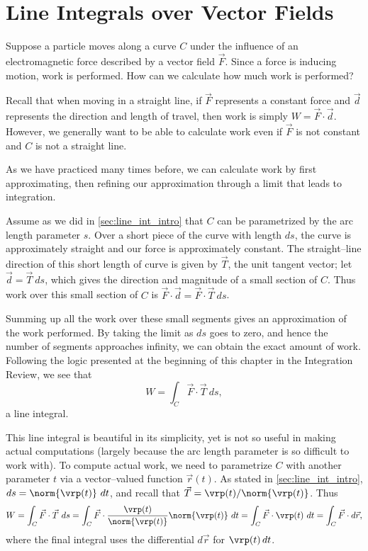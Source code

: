 \section{Line Integrals over Vector Fields}\label{sec:line_int_vf}

Suppose a particle moves along a curve $C$ under the influence of an electromagnetic force described by a vector field $\vec F$. Since a force is inducing motion, work is performed. How can we calculate how much work is performed?

Recall that when moving in a straight line, if $\vec F$ represents a constant force and $\vec d$ represents the direction and length of travel, then work is simply $W = \vec F\cdot \vec d$. However, we generally want to be able to calculate work even if $\vec F$ is not constant and $C$ is not a straight line.

As we have practiced many times before, we can calculate work by first approximating, then refining our approximation through a limit that leads to integration. 

Assume as we did in \autoref{sec:line_int_intro} that $C$ can be parametrized by the arc length parameter $s$. Over a short piece of the curve with length $ds$, the curve is approximately straight and our force is approximately constant. The straight--line direction of this short length of curve is given by $\vec T$, the unit tangent vector;   let $\vec d = \vec T\ ds$, which gives  the direction and magnitude of a small section of $C$. Thus work over this small section of $C$ is $\vec F \cdot \vec d = \vec F\cdot \vec T\ ds$. 

Summing up all the work over these small segments gives an approximation of the work performed. By taking the limit as $ds$ goes to zero, and hence the number of segments approaches infinity, we can obtain the exact amount of work. Following the logic presented at the beginning of this chapter in the Integration Review, we see that 
\[W = \int_C \vec F\cdot \vec T\ ds,\]
a line integral.

This line integral is beautiful in its simplicity, yet is not so useful in making actual computations (largely because the arc length parameter is so difficult to work with). To compute actual work, we need to parametrize $C$ with another parameter  $t$ via a vector--valued function $\vec r(t)$. As stated in \autoref{sec:line_int_intro}, $ds = \norm{\vrp(t)}\ dt$, and recall that $\vec T = \vrp(t)/\norm{\vrp(t)}$. Thus
\begin{equation}
W = \int_C \vec F\cdot\vec T\ ds
= \int_C \vec F\cdot \frac{\vrp(t)}{\norm{\vrp(t)}}\norm{\vrp(t)}\ dt
= \int_C\vec F\cdot \vrp(t)\ dt = \int_C \vec F\cdot d\vec r,
\label{eq:line_integral}
\end{equation}
where the final integral uses the differential $d\vec r$ for $\vrp(t)\,dt$.

